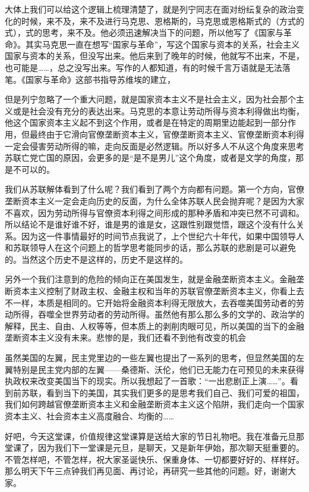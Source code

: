 \documentclass[UTF8, 12pt, a4paper]{ctexrep}
\begin{document}
大体上我们可以给这个逻辑上梳理清楚了，就是列宁同志在面对纷纭复杂的政治变化的时候，来不及，来不及进行马克思、恩格斯的，马克思或恩格斯式的（方式的式），式的思考，来不及。他必须迅速解决当下的问题，所以他写了《国家与革命》。其实马克思一直在想写“国家与革命”，写这个国家与资本的关系，社会主义国家与资本的关系，但没写出来。他后来到了晚年的时候，他就写不出来，不是，也可能是……，总之没写出来。写作的人都知道，有的时候千言万语就是无法落笔。《国家与革命》这部书指导苏维埃的建立，

但是列宁忽略了一个重大问题，就是国家资本主义不是社会主义，因为社会那个主义或是社会没有充分的表达出来。马克思的本意让劳动所得与资本利得做出均衡，他这个国家资本主义起不到这个作用，或者是在特定的周期里边能起到一部分作用，但最终由于它滑向官僚垄断资本主义，官僚垄断资本主义、官僚垄断资本利得一定会侵害劳动所得的嘛，走向反面是必然逻辑。所以好多人不从这个角度来思考苏联亡党亡国的原因，会更多的是“是不是男儿”这个角度，或者是文学的角度，那是不可以的。

我们从苏联解体看到了什么呢？我们看到了两个方向都有问题。第一个方向，官僚垄断资本主义一定会走向历史的反面，为什么全体苏联人民会抛弃呢？是因为大家不喜欢，因为劳动所得与官僚资本利得之间形成的那种矛盾和冲突已然不可调和。所以结论不是谁好谁不好，谁是男的谁是女，这跟性别跟觉悟，跟这个没有什么关系。因为这一件事情最好的时间节点我说了，上个世纪六十年代，如果中国领导人和苏联领导人在这个问题上的哲学思考能同步的话，那么苏联的悲剧是可以避免的。当然这个历史不是这样的，历史不是这样的。

另外一个我们注意到的危险的倾向正在美国发生，就是金融垄断资本主义。金融垄断资本主义控制了财政主权、金融主权和当年的苏联官僚垄断资本主义，你看上去不一样，本质是相同的。它开始将金融资本利得无限放大，去吞噬美国劳动者的劳动所得，吞噬全世界劳动者的劳动所得。虽然他有那么那么多的文学的、政治学的解释，民主、自由、人权等等，但本质上的剥削肉眼可见，所以美国的当下的金融垄断资本主义没有未来。悲惨的是，我们还看不到他有改变的机会

虽然美国的左翼，民主党里边的一些左翼也提出了一系列的思考，但显然美国的左翼特别是民主党内部的左翼——桑德斯、沃伦，他们已无能力在可预见的未来获得执政权来改变美国当下的现实。所以我想起了一首歌：“一出悲剧正上演……”。看到前苏联，看到当下的美国，其实我们更多的是思考我们自己、我们可爱的祖国，我们如何跨越官僚垄断资本主义和金融垄断资本主义这个陷阱，我们走向一个国家资本主义、社会资本主义高度融合、均衡的……

好吧，今天这堂课，价值规律这堂课算是送给大家的节日礼物吧。我在准备元旦那堂课了，因为我们下一堂课是元旦，是聊天，又是新年伊始，那次聊天挺重要的。不管怎样吧，不管怎样，祝大家圣诞快乐、保重身体、一切都要好好的、样样好。那么明天下午三点钟我们再见面、再讨论，再研究一些其他的问题。好，谢谢大家。
\end{document}
